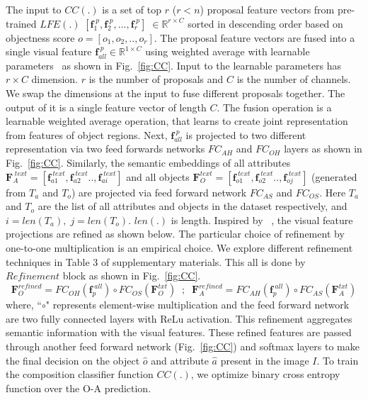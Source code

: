 \documentclass{bmvc2k}
\begin{document}
The input to $CC(.)$  is a set of top $r$ ($r < n$) proposal feature vectors from pre-trained $LFE(.)$ $[\textbf{f}^{\;p}_1, \textbf{f}^{\;p}_2, ..., \textbf{f}^{\;p}_r] \; \in \mathbb{R}^{r \times C}$ sorted in descending order based on objectness score $o = [o_1, o_2, .., o_r]$. The proposal feature vectors are fused into a single visual feature $\textbf{f}^{\;p}_{all} \in \mathbb{R}^{1 \times C} $ using weighted average with learnable parameters~\cite{kumar2021stressnet} as shown in Fig.~\ref{fig:CC}.
Input to the learnable parameters has $r \times C$ dimension. $r$ is the number of proposals and $C$ is the number of channels. We swap the dimensions at the input to fuse different proposals together. The output of it is a single feature vector of length $C$.
The fusion operation is a learnable weighted average operation, that learns to create joint representation from features of object regions. 
Next, $\textbf{f}^{\;p}_{all}$ is projected to two different representation via two feed forwards networks $FC_{AH}$ and $FC_{OH}$ layers as shown in Fig.~\ref{fig:CC}. 
Similarly, the semantic embeddings of all attributes $\textbf{F}^{\;text}_A = [\textbf{f}^{\;text}_{a1}, \textbf{f}^{\;text}_{a2}.., \textbf{f}^{\;text}_{ai}]$ and all objects $\textbf{F}^{text}_O = [\textbf{f}^{\;text}_{o1}, \textbf{f}^{\;text}_{o2}.., \textbf{f}^{\;text}_{oj}]$ (generated from $T_a$ and $T_o$) are projected via feed forward network $FC_{AS}$ and $FC_{OS}$.
Here $T_a$ and $T_o$ are the list of all attributes and objects in the dataset respectively, and $i = len(T_a),\; j = len(T_o)$. $len(.)$ is length.
Inspired by ~\cite{vaswani2017attention,ulutan2020vsgnet,li2020symmetry,iftekhar2021gtnet,iftekhar2022look}, the visual feature projections are refined as shown below. 
The particular choice of refinement by one-to-one multiplication is an empirical choice. We explore different refinement techniques in Table 3 of supplementary materials.
This all is done by $Refinement$ block as shown in Fig.~\ref{fig:CC}.
\begin{equation}
    \textbf{F}^{refined}_O = FC_{OH}(\textbf{f}^{\;all}_p) \circ FC_{OS}(\textbf{F}^{txt}_O)
\;\; ;\;\; 
    \textbf{F}^{refined}_A = FC_{AH}(\textbf{f}^{\;all}_p) \circ FC_{AS}(\textbf{F}^{txt}_A)
    \label{eq:refine_qa}
\end{equation}
where, ``$\circ$" represents element-wise multiplication and the feed forward network are two fully connected layers with ReLu activation.
This refinement aggregates semantic information with the visual features. These refined features are passed through another feed forward network (Fig.~\ref{fig:CC}) and softmax layers to make the final decision on the object $\hat{o}$ and attribute $\hat{a}$ present in the image $I$. To train the composition classifier function $CC(.)$, we optimize binary cross entropy function over the O-A prediction.
\end{document}
